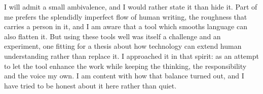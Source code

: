 I will admit a small ambivalence, and I would rather state it than hide it. Part of me prefers the splendidly imperfect flow of human writing, the roughness that carries a person in it, and I am aware that a tool which smooths language can also flatten it. But using these tools well was itself a challenge and an experiment, one fitting for a thesis about how technology can extend human understanding rather than replace it. I approached it in that spirit: as an attempt to let the tool enhance the work while keeping the thinking, the responsibility and the voice my own. I am content with how that balance turned out, and I have tried to be honest about it here rather than quiet.